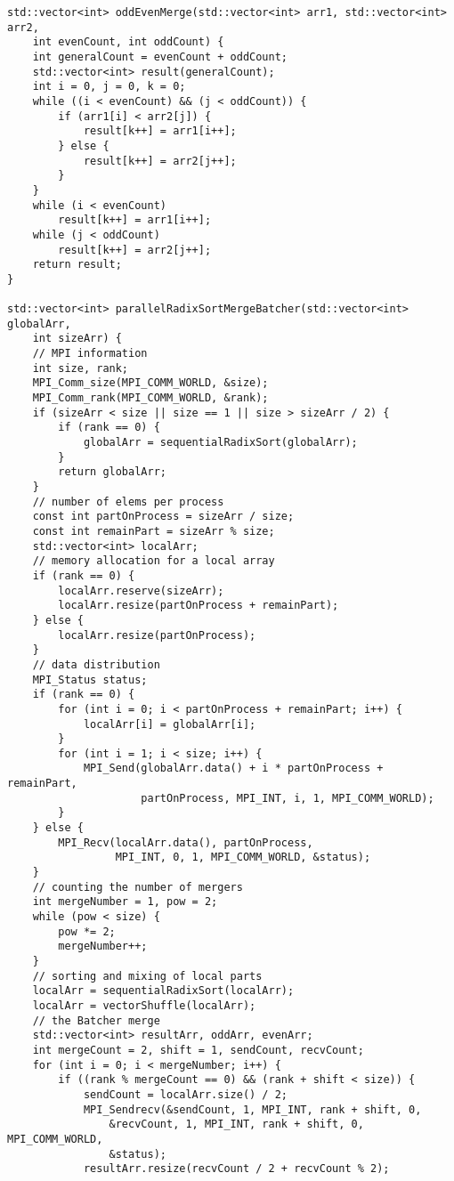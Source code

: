 \documentclass{report}
\begin{document}
\begin{lstlisting}
std::vector<int> oddEvenMerge(std::vector<int> arr1, std::vector<int> arr2,
    int evenCount, int oddCount) {
    int generalCount = evenCount + oddCount;
    std::vector<int> result(generalCount);
    int i = 0, j = 0, k = 0;
    while ((i < evenCount) && (j < oddCount)) {
        if (arr1[i] < arr2[j]) {
            result[k++] = arr1[i++];
        } else {
            result[k++] = arr2[j++];
        }
    }
    while (i < evenCount)
        result[k++] = arr1[i++];
    while (j < oddCount)
        result[k++] = arr2[j++];
    return result;
}

std::vector<int> parallelRadixSortMergeBatcher(std::vector<int> globalArr,
    int sizeArr) {
    // MPI information
    int size, rank;
    MPI_Comm_size(MPI_COMM_WORLD, &size);
    MPI_Comm_rank(MPI_COMM_WORLD, &rank);
    if (sizeArr < size || size == 1 || size > sizeArr / 2) {
        if (rank == 0) {
            globalArr = sequentialRadixSort(globalArr);
        }
        return globalArr;
    }
    // number of elems per process
    const int partOnProcess = sizeArr / size;
    const int remainPart = sizeArr % size;
    std::vector<int> localArr;
    // memory allocation for a local array
    if (rank == 0) {
        localArr.reserve(sizeArr);
        localArr.resize(partOnProcess + remainPart);
    } else {
        localArr.resize(partOnProcess);
    }
    // data distribution
    MPI_Status status;
    if (rank == 0) {
        for (int i = 0; i < partOnProcess + remainPart; i++) {
            localArr[i] = globalArr[i];
        }
        for (int i = 1; i < size; i++) {
            MPI_Send(globalArr.data() + i * partOnProcess + remainPart,
                     partOnProcess, MPI_INT, i, 1, MPI_COMM_WORLD);
        }
    } else {
        MPI_Recv(localArr.data(), partOnProcess,
                 MPI_INT, 0, 1, MPI_COMM_WORLD, &status);
    }
    // counting the number of mergers
    int mergeNumber = 1, pow = 2;
    while (pow < size) {
        pow *= 2;
        mergeNumber++;
    }
    // sorting and mixing of local parts
    localArr = sequentialRadixSort(localArr);
    localArr = vectorShuffle(localArr);
    // the Batcher merge
    std::vector<int> resultArr, oddArr, evenArr;
    int mergeCount = 2, shift = 1, sendCount, recvCount;
    for (int i = 0; i < mergeNumber; i++) {
        if ((rank % mergeCount == 0) && (rank + shift < size)) {
            sendCount = localArr.size() / 2;
            MPI_Sendrecv(&sendCount, 1, MPI_INT, rank + shift, 0,
                &recvCount, 1, MPI_INT, rank + shift, 0, MPI_COMM_WORLD,
                &status);
            resultArr.resize(recvCount / 2 + recvCount % 2);

\end{lstlisting}
\end{document}
